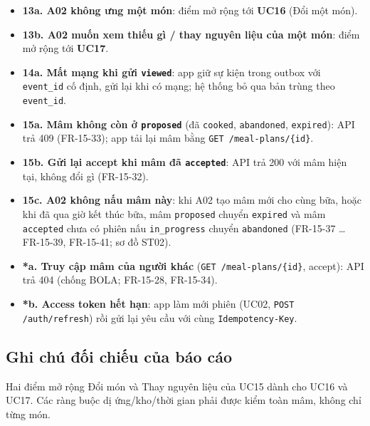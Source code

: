 \begin{itemize}
\item \textbf{13a. A02 không ưng một món}: điểm mở rộng tới \textbf{UC16} (Đổi một món).
\item \textbf{13b. A02 muốn xem thiếu gì /\allowbreak{} thay nguyên liệu của một món}: điểm mở rộng tới \textbf{UC17}.
\item \textbf{14a. Mất mạng khi gửi {\small\texttt{viewed}}}: app giữ sự kiện trong outbox với {\small\texttt{event\_\allowbreak{}\allowbreak{}id}} cố định, gửi lại khi có mạng; hệ thống bỏ qua bản trùng theo {\small\texttt{event\_\allowbreak{}\allowbreak{}id}}.
\item \textbf{15a. Mâm không còn ở {\small\texttt{proposed}}} (đã {\small\texttt{cooked}}, {\small\texttt{abandoned}}, {\small\texttt{expired}}): API trả 409 (FR-\allowbreak{}15-\allowbreak{}33); app tải lại mâm bằng {\small\texttt{GET /\allowbreak{}\allowbreak{}meal-\allowbreak{}plans/\allowbreak{}\allowbreak{}\{id\}}}.
\item \textbf{15b. Gửi lại accept khi mâm đã {\small\texttt{accepted}}}: API trả 200 với mâm hiện tại, không đổi gì (FR-\allowbreak{}15-\allowbreak{}32).
\item \textbf{15c. A02 không nấu mâm này}: khi A02 tạo mâm mới cho cùng bữa, hoặc khi đã qua giờ kết thúc bữa, mâm {\small\texttt{proposed}} chuyển {\small\texttt{expired}} và mâm {\small\texttt{accepted}} chưa có phiên nấu {\small\texttt{in\_\allowbreak{}\allowbreak{}progress}} chuyển {\small\texttt{abandoned}} (FR-\allowbreak{}15-\allowbreak{}37 \ldots{} FR-\allowbreak{}15-\allowbreak{}39, FR-\allowbreak{}15-\allowbreak{}41; sơ đồ ST02).
\item \textbf{*a. Truy cập mâm của người khác} ({\small\texttt{GET /\allowbreak{}\allowbreak{}meal-\allowbreak{}plans/\allowbreak{}\allowbreak{}\{id\}}}, accept): API trả 404 (chống BOLA; FR-\allowbreak{}15-\allowbreak{}28, FR-\allowbreak{}15-\allowbreak{}34).
\item \textbf{*b. Access token hết hạn}: app làm mới phiên (UC02, {\small\texttt{POST /\allowbreak{}\allowbreak{}auth/\allowbreak{}\allowbreak{}refresh}}) rồi gửi lại yêu cầu với cùng {\small\texttt{Idempotency-\allowbreak{}Key}}.
\end{itemize}
\subsection{Ghi chú đối chiếu của báo cáo}
Hai điểm mở rộng Đổi món và Thay nguyên liệu của UC15 dành cho UC16 và UC17. Các ràng buộc dị ứng/\allowbreak{}kho/\allowbreak{}thời gian phải được kiểm toàn mâm, không chỉ từng món.

